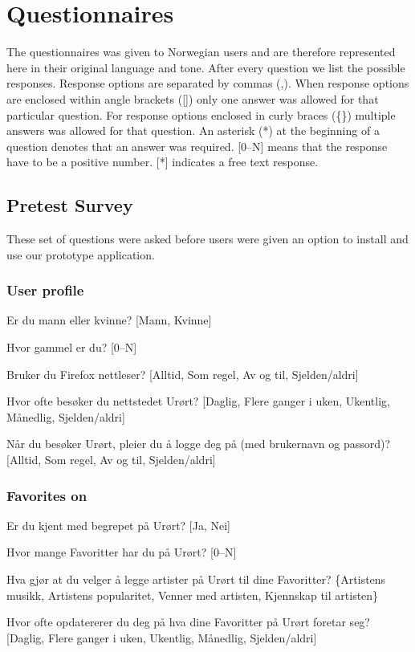 \chapter{Questionnaires}
\label{appendix:questionnaire}

The questionnaires was given to Norwegian users and are therefore represented
here in their original language and tone. After every question we list the
possible responses. Response options are separated by commas (,). When
response options are enclosed within angle brackets ([]) only one answer was
allowed for that particular question. For response options enclosed in curly
braces (\{\}) multiple answers was allowed for that question. An asterisk (*)
at the beginning of a question denotes that an answer was required. [0--N]
means that the response have to be a positive number. [*] indicates a free
text response.

\section{Pretest Survey}

These set of questions were asked before users were given an option to install
and use our prototype application.

\subsection{User profile}

\begin{enum}
  \item Er du mann eller kvinne?
    [Mann, Kvinne]
  \item Hvor gammel er du?
    [0--N]
  \item * Bruker du Firefox nettleser?
    [Alltid, Som regel, Av og til, Sjelden/aldri]
  \item * Hvor ofte besøker du nettstedet Urørt?
    [Daglig, Flere ganger i uken, Ukentlig, Månedlig, Sjelden/aldri]
  \item * Når du besøker Urørt, pleier du å logge deg på (med brukernavn
    og passord)?
    [Alltid, Som regel, Av og til, Sjelden/aldri]
\end{enum}

\subsection{Favorites on \urort{}}

\begin{enum}
  \item * Er du kjent med begrepet  på Urørt?
    [Ja, Nei]
  \item Hvor mange Favoritter har du på Urørt?
    [0--N]
  \item Hva gjør at du velger å legge artister på Urørt til dine Favoritter?
    \{Artistens musikk, Artistens popularitet, Venner med artisten,
    Kjennskap til artisten\}
  \item  Hvor ofte opdatererer du deg på hva dine Favoritter på Urørt
    foretar seg?
    [Daglig, Flere ganger i uken, Ukentlig, Månedlig, Sjelden/aldri]
\end{enum}

